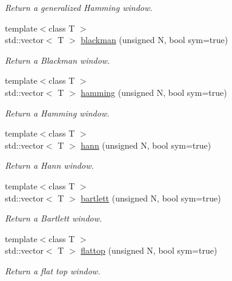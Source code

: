 \begin{DoxyCompactItemize}
\begin{DoxyCompactList}\small\item\em Return a generalized Hamming window. \end{DoxyCompactList}\item 
{\footnotesize template$<$class T $>$ }\\std\+::vector$<$ T $>$ \mbox{\hyperlink{namespacedsp_1_1window_a10cdac66f0417d5286f11cd27b699e71}{blackman}} (unsigned N, bool sym=true)
\begin{DoxyCompactList}\small\item\em Return a Blackman window. \end{DoxyCompactList}\item 
{\footnotesize template$<$class T $>$ }\\std\+::vector$<$ T $>$ \mbox{\hyperlink{namespacedsp_1_1window_ab669d3d273b9edc883f4729b2e801157}{hamming}} (unsigned N, bool sym=true)
\begin{DoxyCompactList}\small\item\em Return a Hamming window. \end{DoxyCompactList}\item 
{\footnotesize template$<$class T $>$ }\\std\+::vector$<$ T $>$ \mbox{\hyperlink{namespacedsp_1_1window_a9bb07facf27b284757ddae054c8a3621}{hann}} (unsigned N, bool sym=true)
\begin{DoxyCompactList}\small\item\em Return a Hann window. \end{DoxyCompactList}\item 
{\footnotesize template$<$class T $>$ }\\std\+::vector$<$ T $>$ \mbox{\hyperlink{namespacedsp_1_1window_a7b059f993849f7e9048b274071e76335}{bartlett}} (unsigned N, bool sym=true)
\begin{DoxyCompactList}\small\item\em Return a Bartlett window. \end{DoxyCompactList}\item 
{\footnotesize template$<$class T $>$ }\\std\+::vector$<$ T $>$ \mbox{\hyperlink{namespacedsp_1_1window_adc37567364a8a61d146b3920d4113e07}{flattop}} (unsigned N, bool sym=true)
\begin{DoxyCompactList}\small\item\em Return a flat top window. \end{DoxyCompactList}\item 

\end{DoxyCompactItemize}
